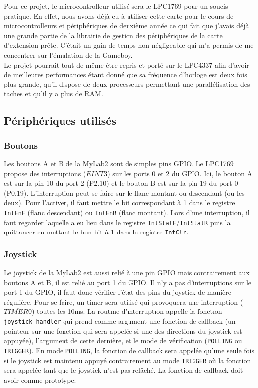 \documentclass[a4paper]{article}
\begin{document}
Pour ce projet, le microcontrolleur utilisé sera le LPC1769 pour un soucis pratique.
En effet, nous avons déjà eu à utiliser cette carte pour le cours de microcontrolleurs
et périphériques de deuxième année ce qui fait que j'avais déjà une grande partie de
la librairie de gestion des périphériques de la carte d'extension prête. C'était un
gain de temps non négligeable qui m'a permis de me concentrer sur l'émulation de
la Gameboy. \\

Le projet pourrait tout de même être repris et porté sur le LPC4337 afin d'avoir de
meilleures performances étant donné que sa fréquence d'horloge est deux fois plus
grande, qu'il dispose de deux processeurs permettant une parallélisation des taches
et qu'il y a plus de RAM.

\newpage


\subsection{Périphériques utilisés}
\subsubsection{Boutons}
Les boutons A et B de la MyLab2 sont de simples pins GPIO. Le LPC1769 propose
des interruptions ($\overline{EINT3}$) sur les ports 0 et 2 du GPIO. Ici, le bouton A est sur la pin
10 du port 2 (P2.10) et le bouton B est sur la pin 19 du port 0 (P0.19). L'interruption
peut se faire sur le flanc montant ou descendant (ou les deux). Pour l'activer,
il faut mettre le bit correspondant à 1 dans le registre \texttt{IntEnF}
(flanc descendant) ou \texttt{IntEnR} (flanc montant). Lors d'une interruption,
il faut regarder laquelle a eu lieu dans le registre \texttt{IntStatF}/\texttt{IntStatR}
puis la quittancer en mettant le bon bit à 1 dans le registre \texttt{IntClr}.

\subsubsection{Joystick}
Le joystick de la MyLab2 est aussi relié à une pin GPIO mais contrairement aux
boutons A et B, il est relié au port 1 du GPIO. Il n'y a pas d'interruptions
sur le port 1 du GPIO, il faut donc vérifier l'état des pins du joystick de manière
régulière. Pour se faire, un timer sera utilisé qui provoquera une interruption
($\overline{TIMER0}$) toutes les 10ms. La routine d'interruption appelle la fonction \texttt{joystick_handler}
qui prend comme argument une fonction de callback (un pointeur sur une fonction
qui sera appelée si une des directions du joystick est appuyée), l'argument de cette 
dernière, et le mode de vérification (\texttt{POLLING} ou \texttt{TRIGGER}). 
En mode \texttt{POLLING}, la fonction de callback sera appelée qu'une seule
fois si le joystick est maintenu appuyé contrairement au mode \texttt{TRIGGER}
où la fonction sera appelée tant que le joystick n'est pas relâché. La fonction de
callback doit avoir comme prototype:
\end{document}

